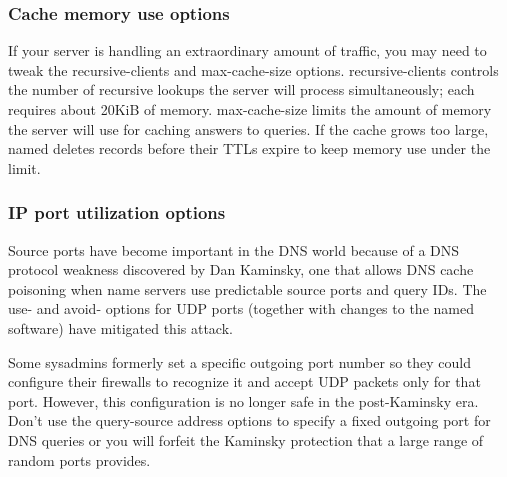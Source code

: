 \subsubsection{Cache memory use options}


If your server is handling an extraordinary amount of traffic, you may
need to tweak the
\protect\hypertarget{part0024_split_037.htmlux5cux23_idIndexMarker2134}{}{}{recursive-clients}
and
\protect\hypertarget{part0024_split_037.htmlux5cux23_idIndexMarker2135}{}{}{max-cache-size}
options{.} {recursive-clients} controls the number of recursive lookups
the server will process simultaneously; each requires about 20KiB of
memory. {max-cache-size} limits the amount of memory the server will use
for caching answers to queries. If the cache grows too large, {named}
deletes records before their TTLs expire to keep memory use under the
limit.

\subsubsection[IP port utilization options]{\texorpdfstring{IP port
utilization
options\protect\hypertarget{part0024_split_037.htmlux5cux23_idIndexMarker2136}{}{}\protect\hypertarget{part0024_split_037.htmlux5cux23_idIndexMarker2137}{}{}\protect\hypertarget{part0024_split_037.htmlux5cux23_idIndexMarker2138}{}{}\protect\hypertarget{part0024_split_037.htmlux5cux23_idIndexMarker2139}{}{}\protect\hypertarget{part0024_split_037.htmlux5cux23_idIndexMarker2140}{}{}{\protect\hypertarget{part0024_split_037.htmlux5cux23_idIndexMarker2141}{}{}}}{IP port utilization options}}


Source ports have become important in the DNS world because of a DNS
protocol weakness discovered by
\protect\hypertarget{part0024_split_037.htmlux5cux23_idIndexMarker2142}{}{}Dan
Kaminsky, one that allows
\protect\hypertarget{part0024_split_037.htmlux5cux23_idIndexMarker2143}{}{}\protect\hypertarget{part0024_split_037.htmlux5cux23_idIndexMarker2144}{}{}DNS
cache poisoning when name servers use predictable source ports and query
IDs. The {use-} and {avoid-} options for UDP ports (together with
changes to the {named} software) have mitigated this attack.

Some sysadmins formerly set a specific outgoing port number so they
could configure their firewalls to recognize it and accept UDP packets
only for that port. However, this configuration is no longer safe in the
post-Kaminsky era. Don't use the {query-source} address options to
specify a fixed outgoing port for DNS queries or you will forfeit the
Kaminsky protection that a large range of random ports provides.

